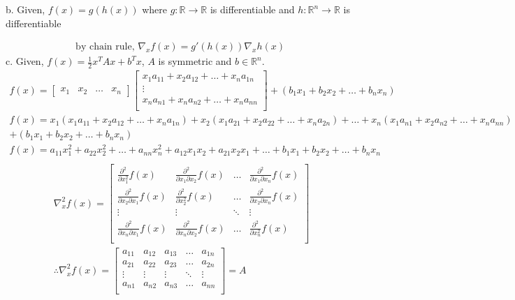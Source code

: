 \documentclass{article}
\begin{document}
b. Given, $f(x) = g(h(x))$ where $g: \mathbb{R} \rightarrow \mathbb{R}$ is differentiable and $h: \mathbb{R}^n \rightarrow \mathbb{R}$ is differentiable

\begin{gather*}
    \text{by chain rule}, \, 
    \nabla_x f(x) = g'(h(x))\nabla_x h(x) \; 
\end{gather*}
c. Given, $f(x) = \frac{1}{2} x^TAx + b^Tx$, $A$ is symmetric and $b \in \mathbb{R}^n$. \\
\begin{gather*}
    f(x) = 
    \begin{bmatrix}
        x_1 & x_2 & \hdots & x_n
    \end{bmatrix}
    \begin{bmatrix}
        x_1a_{11} + x_2a_{12} + \hdots + x_na_{1n} \\
        \vdots  \\
        x_na_{n1} + x_na_{n2} + \hdots + x_na_{nn} \\
    \end{bmatrix}
    +
    (b_1x_1 + b_2x_2 + \hdots + b_nx_n) \\
    f(x) = x_1(x_1a_{11} + x_2a_{12} + \hdots + x_na_{1n}) + 
    x_2(x_1a_{21} +  x_2a_{22} + \hdots + x_na_{2n} ) + \hdots + 
    x_n(x_1a_{n1} +  x_2a_{n2} + \hdots + x_na_{nn} ) \\ 
    + (b_1x_1 + b_2x_2 + \hdots + b_nx_n) \\
    f(x) = a_{11}x_1^2 + a_{22}x_2^2 + \hdots + a_{nn}x_n^2 + a_{12}x_1x_2 + a_{21}x_2x_1 + \hdots + b_1x_1 + b_2x_2 + \hdots + b_nx_n \\
\end{gather*}
\begin{gather*}
    \nabla _x ^2 f(x) = \begin{bmatrix}
        \frac{\partial ^2}{\partial x_1^2} f(x) & \frac{\partial ^2}{\partial x_1 \partial x_2}f(x) & \hdots & \frac{\partial ^2}{\partial x_1 \partial x_n}f(x) \\
        \frac{\partial ^2}{\partial x_2 \partial x_1}f(x) &\frac{\partial ^2}{\partial x_2^2} f(x) & \hdots & \frac{\partial ^2}{\partial x_2 \partial x_n}f(x) \\
        \vdots & \vdots & \ddots & \vdots \\
        \frac{\partial ^2}{\partial x_n \partial x_1}f(x) &\frac{\partial ^2}{\partial x_n \partial x_2} f(x) & \hdots & \frac{\partial ^2}{\partial x_n^2}f(x) \\
    \end{bmatrix}\\
    \therefore \nabla_x^2 f(x) = \begin{bmatrix}
        a_{11} & a_{12} & a_{13} & \hdots & a_{1n} \\
        a_{21}  & a_{22} & a_{23} & \hdots & a_{2n} \\
        \vdots & \vdots & \vdots & \ddots & \vdots \\
        a_{n1} & a_{n2} & a_{n3} & \hdots &  a_{nn} \\
    \end{bmatrix} = A
\end{gather*}
\end{document}
